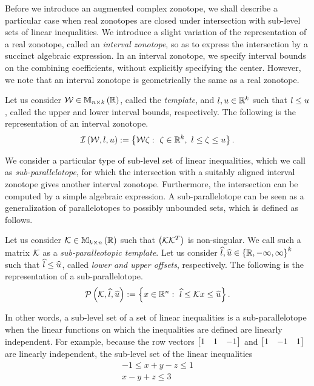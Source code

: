 Before we introduce an augmented complex zonotope, we shall describe a
particular case when real zonotopes are closed under intersection with
sub-level sets of linear inequalities.  We introduce a slight
variation of the representation of a real zonotope, called
an \emph{interval zonotope}, so as to express the intersection by a
succinct algebraic expression.  In an interval zonotope, we specify
interval bounds on the combining coefficients, without explicitly
specifying the center.  However, we note that an interval zonotope is
geometrically the same as a real zonotope.
%
\begin{definition}
Let us consider $\mathcal{W}\in\mathbb{M}_{n\times k}\left(\mathbb{R}\right)$, called the {\it
  template}, and $l,u\in\mathbb{R}^k$ such that $l\leq u$, called
  the upper and lower interval bounds, respectively.  The following is
  the representation of an interval zonotope.
%
\[
\mathit{\operatorname{\mathcal{I}}}\left(\mathcal{W},l,u\right):=\left\{\mathcal{W}\zeta:~\zeta\in\mathbb{R}^k,~l\leq\zeta\leq u\right\}.
\]
%
\end{definition}
%
We consider a particular type of sub-level set of linear
inequalities, which we call as \emph{sub-parallelotope}, for which the
intersection with a suitably aligned interval zonotope gives another
interval zonotope.  Furthermore, the intersection can be computed by a
simple algebraic expression.  A sub-parallelotope can be seen as a
generalization of parallelotopes to possibly unbounded sets, which is defined
as follows.
%
\begin{definition}
Let us consider ${\mathcal{K}}\in\mathbb{M}_{k\times n}\left(\mathbb{R}\right)$ such that
$\left(\mathcal{K}{\mathcal{K}}^T\right)$ is non-singular.  We
call such a matrix $\mathcal{K}$ as a \emph{sub-paralleotopic template}.  Let us
consider
$\widehat{l},\widehat{u}\in\left\{\mathbb{R},-\infty,\infty\right\}^k$ such that $\widehat{l}\leq\widehat{u}$,
called {\it lower and upper offsets}, respectively.  The following is
the representation of a sub-parallelotope.
%
\[
\mathcal{P}\left(\mathcal{K},\widehat{l},\widehat{u}\right):=\left\{x\in\mathbb{R}^n:~\widehat{l}\leq\mathcal{K} x\leq\widehat{u}\right\}.
\]
%
\end{definition}
%
In other words, a sub-level set of a set of linear inequalities is a
sub-parallelotope when the linear functions on which the inequalities
are defined are linearly independent. For example, because the row
vectors $\left[\begin{matrix}1 & 1 & -1 \end{matrix}\right]$ and
$\left[\begin{matrix}1 & -1 & 1\end{matrix}\right]$ are linearly
independent, the sub-level set of
the linear inequalities
%
\begin{align*}
-1\leq x+y-z\leq 1\\
x-y+z\leq 3
\end{align*}
